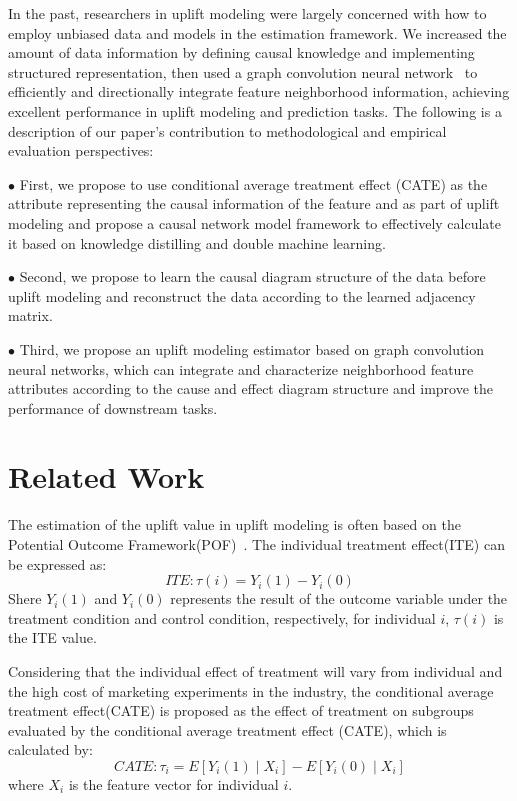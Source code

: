 \documentclass[sigconf,screen]{acmart}
\begin{document}
In the past, researchers in uplift modeling were largely concerned with how to employ unbiased data and models in the estimation framework. We increased the amount of data information by defining causal knowledge and implementing structured representation, then used a graph convolution neural network~\citep{GCN:Zhang}  to efficiently and directionally integrate feature neighborhood information, achieving excellent performance in uplift modeling and prediction tasks. The following is a description of our paper's contribution to methodological and empirical evaluation perspectives:

$\bullet$
First, we propose to use conditional average treatment effect (CATE) as the attribute representing the causal information of the feature and as part of uplift modeling and propose a causal network model framework to effectively calculate it based on knowledge distilling and double machine learning.

$\bullet$ 
Second, we propose to learn the causal diagram structure of the data before uplift modeling and reconstruct the data according to the learned adjacency matrix.

$\bullet$ 
Third, we propose an uplift modeling estimator based on graph convolution neural networks, which can integrate and characterize neighborhood feature attributes according to the cause and effect diagram structure and improve the performance of downstream tasks.
 

\section{Related Work}

The estimation of the uplift value in uplift modeling is often based on the Potential Outcome Framework(POF)~\citep{rubin2005causal}. The individual treatment effect(ITE) can be expressed as:
\begin{equation}
I T E:\tau(i) = Y_{i}(1) - Y_{i}(0)
\end{equation}
Shere $Y_{i}(1)$ and $Y_{i}(0)$ represents the result of the outcome variable under the treatment condition and control condition, respectively, for individual $i$, $\tau(i)$ is the ITE value.

Considering that the individual effect of treatment will vary from individual and the high cost of marketing experiments in the industry, the conditional average treatment effect(CATE) is proposed as the effect of treatment on subgroups evaluated by the conditional average treatment effect (CATE), which is calculated by:
\begin{equation}
C A T E: \tau_{i}=E\left[Y_{i}(1) \mid X_{i}\right]-E\left[Y_{i}(0) \mid X_{i}\right]
\end{equation}
where $X_i$ is the feature vector for individual $i$.
\end{document}
